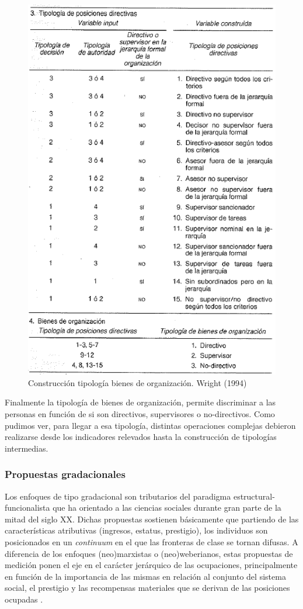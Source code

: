 \documentclass[
]{book}
\begin{document}
\begin{figure}

{\centering \includegraphics[width=0.8\linewidth]{imagenes/wright3} 

}

\caption{Construcción tipología bienes de organización. Wright (1994)}\label{fig:unnamed-chunk-61}
\end{figure}

Finalmente la tipología de bienes de organización, permite discriminar a las personas en función de si son directivos, supervisores o no-directivos. Como pudimos ver, para llegar a esa tipología, distintas operaciones complejas debieron realizarse desde los indicadores relevados hasta la construcción de tipologías intermedias.

\hypertarget{propuestas-gradacionales}{%
\subsubsection{Propuestas gradacionales}\label{propuestas-gradacionales}}

Los enfoques de tipo gradacional son tributarios del paradigma estructural-funcionalista que ha orientado a las ciencias sociales durante gran parte de la mitad del siglo XX. Dichas propuestas sostienen básicamente que partiendo de las características atributivas (ingresos, estatus, prestigio), los individuos son posicionados en un \emph{continuum} en el que las fronteras de clase se tornan difusas. A diferencia de los enfoques (neo)marxistas o (neo)weberianos, estas propuestas de medición ponen el eje en el carácter jerárquico de las ocupaciones, principalmente en función de la importancia de las mismas en relación al conjunto del sistema social, el prestigio y las recompensas materiales que se derivan de las posiciones ocupadas \citep{Ossowski2003, Wright1979, Parsons1954}.
\end{document}
